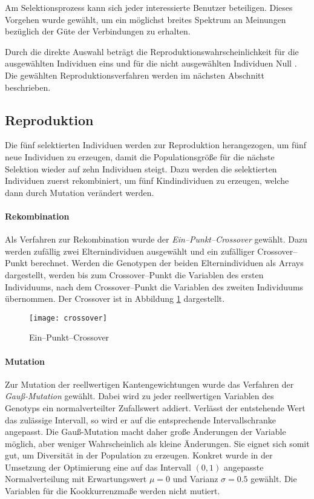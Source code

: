 Am Selektionsprozess kann sich jeder interessierte Benutzer beteiligen. Dieses Vorgehen wurde gewählt, um ein möglichst breites Spektrum an Meinungen bezüglich der Güte der Verbindungen zu erhalten.

Durch die direkte Auswahl beträgt die Reproduktionswahrscheinlichkeit für die ausgewählten Individuen eins und für die nicht ausgewählten Individuen Null \cite{sd2012}. Die gewählten Reproduktionsverfahren werden im nächsten Abschnitt beschrieben.

\subsection{Reproduktion}

Die fünf selektierten Individuen werden zur Reproduktion herangezogen, um fünf neue Individuen zu erzeugen, damit die Populationsgröße für die nächste Selektion wieder auf zehn Individuen steigt. Dazu werden die selektierten Individuen zuerst rekombiniert, um fünf Kindindividuen zu erzeugen, welche dann durch Mutation verändert werden.

\paragraph{Rekombination}

Als Verfahren zur Rekombination wurde der \emph{Ein--Punkt--Crossover} \cite{kw2007} gewählt. Dazu werden zufällig zwei Elternindividuen ausgewählt und ein zufälliger Crossover--Punkt berechnet. Werden die Genotypen der beiden Elternindividuen als Arrays dargestellt, werden bis zum Crossover--Punkt die Variablen des ersten Individuums, nach dem Crossover--Punkt die Variablen des zweiten Individuums übernommen. Der Crossover ist in Abbildung \ref{fig:crossover} dargestellt.

\begin{figure}
\centering
\texttt{[image: crossover]}
\caption{Ein--Punkt--Crossover}
\label{fig:crossover}
\end{figure}

\paragraph{Mutation}

Zur Mutation der reellwertigen Kantengewichtungen wurde das Verfahren der \emph{Gauß-Mutation} \cite{kw2007} gewählt. Dabei wird zu jeder reellwertigen Variablen des Genotyps ein normalverteilter Zufallswert addiert. Verlässt der entstehende Wert das zulässige Intervall, so wird er auf die entsprechende Intervallschranke angepasst. Die Gauß-Mutation macht daher große Änderungen der Variable möglich, aber weniger Wahrscheinlich als kleine Änderungen. Sie eignet sich somit gut, um Diversität in der Population zu erzeugen. Konkret wurde in der Umsetzung der Optimierung eine auf das Intervall \((0,1)\) angepasste Normalverteilung mit Erwartungswert \(\mu=0\) und Varianz \(\sigma=0.5\) gewählt. Die Variablen für die Kookkurrenzmaße werden nicht mutiert.


